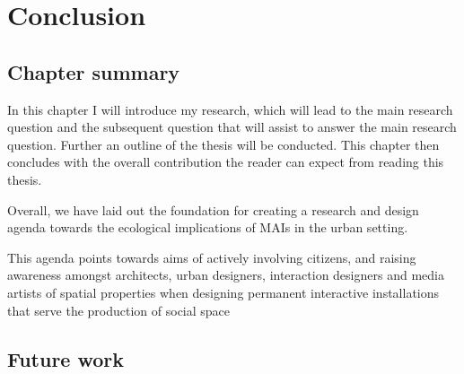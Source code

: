 \chapter{Conclusion}
\label{chapterlabel8}

\section*{Chapter summary}

In this chapter I will introduce my research, which will lead to the main research question and the subsequent question that will assist to answer the main research question. Further an outline of the thesis will be conducted. This chapter then concludes with the overall contribution the reader can expect from reading this thesis.\newpage

Overall, we have laid out the foundation for creating a research and design agenda towards the ecological implications of MAIs in the urban setting. 

This agenda points towards aims of actively involving citizens, and raising awareness amongst architects, urban designers, interaction designers and media artists of spatial properties when designing permanent interactive installations that serve the production of social space


\section{Future work}


